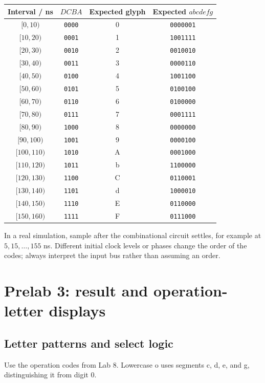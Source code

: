 \documentclass[a4paper,11pt]{article}
\begin{document}
\begin{center}\small
\begin{tabular}{cccc}
\toprule
Interval / ns & $DCBA$ & Expected glyph & Expected $abcdefg$\\\midrule
$[0,10)$ & \texttt{0000} & 0 & \texttt{0000001}\\
$[10,20)$ & \texttt{0001} & 1 & \texttt{1001111}\\
$[20,30)$ & \texttt{0010} & 2 & \texttt{0010010}\\
$[30,40)$ & \texttt{0011} & 3 & \texttt{0000110}\\
$[40,50)$ & \texttt{0100} & 4 & \texttt{1001100}\\
$[50,60)$ & \texttt{0101} & 5 & \texttt{0100100}\\
$[60,70)$ & \texttt{0110} & 6 & \texttt{0100000}\\
$[70,80)$ & \texttt{0111} & 7 & \texttt{0001111}\\
$[80,90)$ & \texttt{1000} & 8 & \texttt{0000000}\\
$[90,100)$ & \texttt{1001} & 9 & \texttt{0000100}\\
$[100,110)$ & \texttt{1010} & A & \texttt{0001000}\\
$[110,120)$ & \texttt{1011} & b & \texttt{1100000}\\
$[120,130)$ & \texttt{1100} & C & \texttt{0110001}\\
$[130,140)$ & \texttt{1101} & d & \texttt{1000010}\\
$[140,150)$ & \texttt{1110} & E & \texttt{0110000}\\
$[150,160)$ & \texttt{1111} & F & \texttt{0111000}\\
\bottomrule\end{tabular}\end{center}


In a real simulation, sample after the combinational circuit settles, for
example at $5,15,\ldots,155$ ns. Different initial clock levels or phases change the
order of the codes; always interpret the input bus rather than assuming an order.

\clearpage\section{Prelab 3: result and operation-letter displays}
\subsection{Letter patterns and select logic}
Use the operation codes from Lab 8. Lowercase o uses segments c, d, e, and g, distinguishing
it from digit 0.
\end{document}
